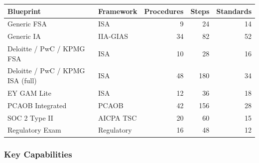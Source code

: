 \documentclass[11pt,a4paper]{article}
\begin{document}
\begin{center}
\small
\begin{tabular}{@{}llrrr@{}}
\toprule
\textbf{Blueprint} & \textbf{Framework} & \textbf{Procedures} & \textbf{Steps} & \textbf{Standards} \\
\midrule
Generic FSA        & ISA        &  9 &  24 & 14 \\
Generic IA         & IIA-GIAS   & 34 &  82 & 52 \\
Deloitte / PwC / KPMG FSA & ISA & 10 &  28 & 16 \\
Deloitte / PwC / KPMG ISA (full) & ISA & 48 & 180 & 34 \\
EY GAM Lite        & ISA        & 12 &  36 & 18 \\
PCAOB Integrated   & PCAOB      & 42 & 156 & 28 \\
SOC 2 Type II      & AICPA TSC  & 20 &  60 & 15 \\
Regulatory Exam    & Regulatory & 16 &  48 & 12 \\
\bottomrule
\end{tabular}
\end{center}

\subsubsection{Key Capabilities}
\end{document}
